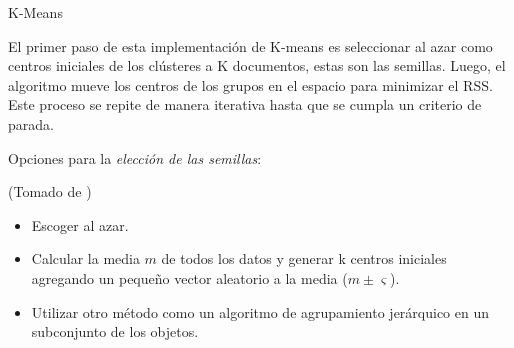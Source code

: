 \documentclass{llncs}
\DeclareMathOperator*{\argmin}{arg\,min}
\begin{document}
	\begin{algorithm}
		\caption{K-Means}
		\begin{algorithmic}[1]
			\EndFor
				\EndFor
				\State{$ j \leftarrow \argmin_{j'}|\overrightarrow{\mu_{j'}}-\overrightarrow{x_{n}}| $}
				\EndFor
				\EndFor
			\EndWhile
		\end{algorithmic}
	\end{algorithm}

El primer paso de esta implementaci\'on de K-means es seleccionar al azar como centros iniciales de los cl\'usteres a K documentos, estas son las semillas. Luego, el algoritmo mueve los centros de los grupos en el espacio para minimizar el RSS. Este proceso se repite de manera iterativa hasta que se cumpla un criterio de parada.

Opciones para la \textit{elecci\'on de las semillas}:
\begin{flushright}
	\scriptsize*(Tomado de \cite{B2})
	\normalsize
\end{flushright}
\begin{itemize}
	\item Escoger al azar.
	\item Calcular la media $ m $ de todos los datos y generar k centros iniciales agregando un pequeño vector aleatorio a la media ($ m \pm \varsigma $).
	\item Utilizar otro método como un algoritmo de agrupamiento jerárquico en un subconjunto de los objetos.
\end{itemize}
\end{document}
